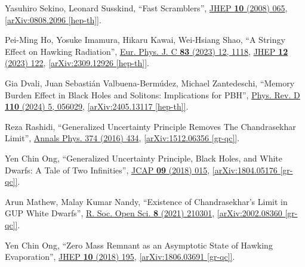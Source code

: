 \documentclass[preprintnumbers, floatfix, preprintnumbers, letterpaper, twocolumn, superscriptaddress,nofootinbib]{revtex4-2}
\begin{document}
\begin{thebibliography}{99}
Yasuhiro Sekino, Leonard Susskind, ``Fast Scramblers'', {\hypersetup{urlcolor=vividviolet}\href{https://iopscience.iop.org/article/10.1088/1126-6708/2008/10/065}{JHEP \textbf{10} (2008) 065}}, \href{https://arxiv.org/abs/0808.2096}{[arXiv:0808.2096 [hep-th]]}.

Pei-Ming Ho, Yosuke Imamura, Hikaru Kawai, Wei-Hsiang Shao, ``A Stringy Effect on Hawking Radiation'', {\hypersetup{urlcolor=vividviolet}\href{https://link.springer.com/article/10.1140/epjc/s10052-023-12302-3}{Eur. Phys. J. C \textbf{83} (2023) 12, 1118}}, {\hypersetup{urlcolor=vividviolet}\href{https://link.springer.com/article/10.1007/JHEP12(2023)122}{JHEP \textbf{12} (2023) 122}}, \href{https://arxiv.org/abs/2309.12926}{[arXiv:2309.12926 [hep-th]]}.

Gia Dvali, Juan Sebastián Valbuena-Bermúdez, Michael Zantedeschi, ``Memory Burden Effect in Black Holes and Solitons: Implications for PBH'', {\hypersetup{urlcolor=vividviolet}\href{https://journals.aps.org/prd/abstract/10.1103/PhysRevD.110.056029}{Phys. Rev. D \textbf{110} (2024) 5, 056029}}, \href{https://arxiv.org/abs/2405.13117}{[arXiv:2405.13117 [hep-th]]}.

Reza Rashidi, ``Generalized Uncertainty Principle Removes The Chandrasekhar Limit'', {\hypersetup{urlcolor=vividviolet}\href{https://linkinghub.elsevier.com/retrieve/pii/S0003491616301890}{Annals Phys. 374 (2016) 434}}, \href{https://arxiv.org/abs/1512.06356}{[arXiv:1512.06356 [gr-qc]]}.

Yen Chin Ong, ``Generalized Uncertainty Principle, Black Holes, and White Dwarfs: A Tale of Two Infinities'', {\hypersetup{urlcolor=vividviolet}\href{https://iopscience.iop.org/article/10.1088/1475-7516/2018/09/015}{JCAP \textbf{09} (2018) 015}}, \href{https://arxiv.org/abs/1804.05176}{[arXiv:1804.05176 [gr-qc]]}.

Arun Mathew, Malay Kumar Nandy, ``Existence of Chandrasekhar’s Limit in GUP White Dwarfs'', {\hypersetup{urlcolor=vividviolet}\href{https://royalsocietypublishing.org/doi/10.1098/rsos.210301}{R. Soc. Open Sci. \textbf{8} (2021) 210301}},  \href{https://arxiv.org/abs/2002.08360}{[arXiv:2002.08360 [gr-qc]]}.

Yen Chin Ong, ``Zero Mass Remnant as an Asymptotic State of Hawking Evaporation'', 	{\hypersetup{urlcolor=vividviolet}\href{https://link.springer.com/article/10.1007/JHEP10(2018)195}{JHEP \textbf{10} (2018) 195}}, \href{https://arxiv.org/abs/1806.03691}{[arXiv:1806.03691 [gr-qc]]}.


\end{thebibliography}
\end{document}
